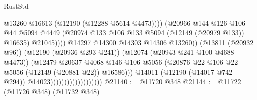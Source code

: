 \begin{lexlean}{RustStd}
\begin{coremodule}
                                                          @13260
                                                          @16613
                                                          (@12190 (@12288 @5614 @4473))))
                                                      (@20966
                                                        @144
                                                        @126
                                                        @106
                                                        @44
                                                        @5094
                                                        @4449
                                                        (@20974
                                                          @133
                                                          @106
                                                          @133
                                                          @5094
                                                          (@12149 (@20979 @133))
                                                          @16635)
                                                        @21045))))
                                                @14297
                                                @14300
                                                @14303
                                                @14306
                                                @13260))
                                            (@13811 (@20932 @96))
                                            (@12190 (@20936 @293 @241))
                                            (@12074 (@20943 @241 @100 @4688 @4473))
                                            (@12479
                                              @20637
                                              @4068
                                              @146
                                              @106
                                              @5056
                                              (@20876
                                                @22
                                                @106
                                                @22
                                                @5056
                                                (@12149 (@20881 @22))
                                                @16586)))
                                          @14011
                                          (@12190 (@14017 @742 @294))
                                          @14023)))))))))))))))))))
@21140 := @11720 @348
@21144 := @11722 (@11726 @348) (@11732 @348)

\end{coremodule}
\end{lexlean}
